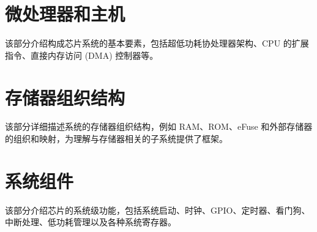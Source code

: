 \documentclass[openany, 10pt]{book}
\begin{document}
\setchineseformatting




\clearpage

\clearpage


\tableofcontents
\clearpage
\listoftables
\clearpage
\listoffigures






\part{微处理器和主机}


该部分介绍构成芯片系统的基本要素，包括超低功耗协处理器架构、CPU 的扩展指令、直接内存访问 (DMA) 控制器等。


\part{存储器组织结构}

该部分详细描述系统的存储器组织结构，例如 RAM、ROM、eFuse 和外部存储器的组织和映射，为理解与存储器相关的子系统提供了框架。


\part{系统组件}


该部分介绍芯片的系统级功能，包括系统启动、时钟、GPIO、定时器、看门狗、中断处理、低功耗管理以及各种系统寄存器。
\end{document}
